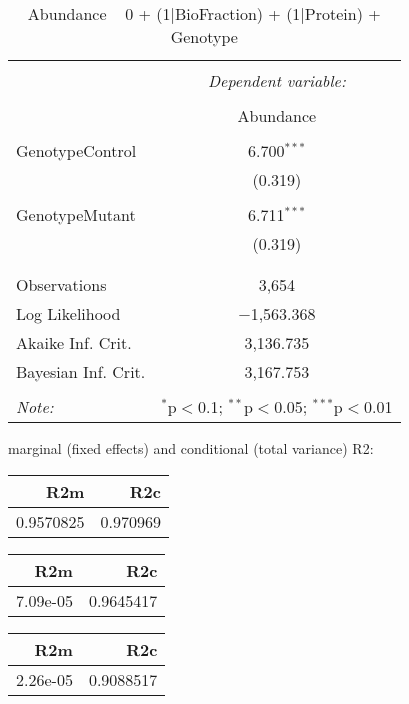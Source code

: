 \documentclass[11pt]{report}
\begin{document}
\begin{table}[!htbp] \centering 
  \caption{Abundance ~ 0 + (1|BioFraction) + (1|Protein) + Genotype} 
  \label{} 
\begin{tabular}{@{\extracolsep{5pt}}lc} 
\\[-1.8ex]\hline 
\hline \\[-1.8ex] 
 & \multicolumn{1}{c}{\textit{Dependent variable:}} \\ 
\cline{2-2} 
\\[-1.8ex] & Abundance \\ 
\hline \\[-1.8ex] 
 GenotypeControl & 6.700$^{***}$ \\ 
  & (0.319) \\ 
  & \\ 
 GenotypeMutant & 6.711$^{***}$ \\ 
  & (0.319) \\ 
  & \\ 
\hline \\[-1.8ex] 
Observations & 3,654 \\ 
Log Likelihood & $-$1,563.368 \\ 
Akaike Inf. Crit. & 3,136.735 \\ 
Bayesian Inf. Crit. & 3,167.753 \\ 
\hline 
\hline \\[-1.8ex] 
\textit{Note:}  & \multicolumn{1}{r}{$^{*}$p$<$0.1; $^{**}$p$<$0.05; $^{***}$p$<$0.01} \\ 
\end{tabular} 
\end{table} 
marginal (fixed effects) and conditional (total variance) R2:

\begin{tabular}{r|r}
\hline
R2m & R2c\\
\hline
0.9570825 & 0.970969\\
\hline
\end{tabular}

\begin{tabular}{r|r}
\hline
R2m & R2c\\
\hline
7.09e-05 & 0.9645417\\
\hline
\end{tabular}

\begin{tabular}{r|r}
\hline
R2m & R2c\\
\hline
2.26e-05 & 0.9088517\\
\hline
\end{tabular}
\end{document}
